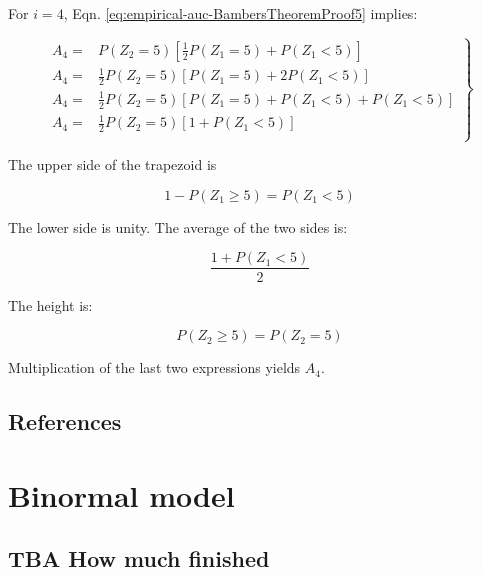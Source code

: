 \documentclass[
]{book}
\begin{document}
For \(i = 4\), Eqn. \eqref{eq:empirical-auc-BambersTheoremProof5} implies:

\begin{equation}
\left.
\begin{aligned}
A_4 =& P\left ( Z_2=5 \right )\left [ \frac{1}{2}P\left ( Z_1=5 \right ) + P\left ( Z_1<5 \right )\right ] \\
A_4 =& \frac{1}{2}P\left ( Z_2=5 \right )\left [ P\left ( Z_1=5 \right ) + 2P\left ( Z_1<5 \right )\right ] \\
A_4 =& \frac{1}{2}P\left ( Z_2=5 \right )\left [ P\left ( Z_1=5 \right ) +P\left ( Z_1<5 \right ) + P\left ( Z_1<5 \right )\right ] \\
A_4 =& \frac{1}{2}P\left ( Z_2=5 \right )\left [ 1 + P\left ( Z_1<5 \right )\right ] \\
\end{aligned}
\right \}
\end{equation}

The upper side of the trapezoid is

\begin{equation}
1-P\left ( Z_1 \geq 5 \right )= P\left ( Z_1 < 5 \right )
\end{equation}

The lower side is unity. The average of the two sides is:

\begin{equation}
\frac{1 + P\left ( Z_1 < 5 \right )}{2}
\end{equation}

The height is:

\begin{equation}
P\left ( Z_2 \geq 5 \right ) = P\left ( Z_2 = 5 \right )
\end{equation}

Multiplication of the last two expressions yields \(A_4\).

\hypertarget{empirical-auc-references}{%
\section{References}\label{empirical-auc-references}}

\hypertarget{binormal-model}{%
\chapter{Binormal model}\label{binormal-model}}

\hypertarget{binormal-model-how-much-finished}{%
\section{TBA How much finished}\label{binormal-model-how-much-finished}}
\end{document}
